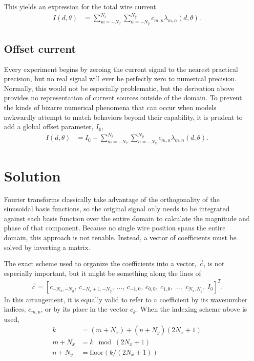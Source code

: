 \documentclass{article}
\begin{document}
This yields an expression for the total wire current
\begin{align}
I(d,\theta) &= \sum_{m=-N_x}^{N_x} \sum_{n=-N_y}^{N_y} c_{m,n} \lambda_{m,n}(d,\theta).
\end{align}

\subsection{Offset current}

Every experiment begins by zeroing the current signal to the nearest practical precision, but no real signal will ever be perfectly zero to numerical precision.  Normally, this would not be especially problematic, but the derivation above provides no representation of current sources outside of the domain.  To prevent the kinds of bizarre numerical phenomena that can occur when models awkwardly attempt to match behaviors beyond their capability, it is prudent to add a global offset parameter, $I_0$,  
\begin{align}
I(d,\theta) &= I_0 + \sum_{m=-N_x}^{N_x} \sum_{n=-N_y}^{N_y} c_{m,n} \lambda_{m,n}(d,\theta)\label{eqn:I}.
\end{align}


\section{Solution}

Fourier transforms classically take advantage of the orthogonality of the sinusoidal basis functions, so the original signal only needs to be integrated against each basis function over the entire domain to calculate the magnitude and phase of that component.  Because no single wire position spans the entire domain, this approach is not tenable.  Instead, a vector of coefficients must be solved by inverting a matrix.

The exact scheme used to organize the coefficients into a vector, $\vec{c}$, is not especially important, but it might be something along the lines of 
\begin{align}
\vec{c} = [c_{-N_x,-N_y},\ c_{-N_x+1, -N_y},\ \ldots,\ c_{-1,0},\ c_{0,0},\ c_{1,0},\ \ldots,\ c_{N_x,N_y},\ I_0]^T.
\end{align}
In this arrangement, it is equally valid to refer to a coefficient by its wavenumber indices, $c_{m,n}$, or by its place in the vector $c_k$.  When the indexing scheme above is used,
\begin{align}
k &= (m + N_x) + (n+N_y) (2N_x+1)\\
m + N_x &= k \mod{(2N_x+1)}\\
n + N_y &= \mathrm{floor}(k / (2N_x+1))
\end{align}
\end{document}

